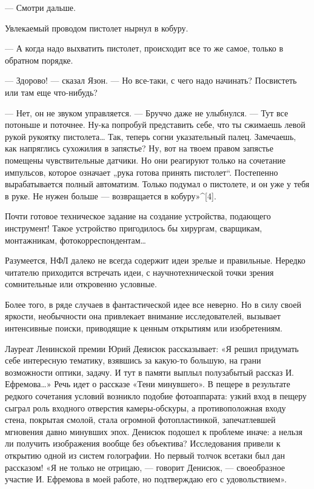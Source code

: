 — Смотри дальше.

Увлекаемый проводом пистолет нырнул в кобуру.

— А когда надо  выхватить пистолет, происходит все  то же самое, только  в
обратном порядке.

— Здорово! — сказал Язон. — Но все-таки, с чего надо начинать?  Посвистеть
или там еще что-нибудь?

— Нет, он не  звуком управляется. —  Бруччо даже не  улыбнулся. — Тут  все
потоньше и  поточнее. Ну-ка  попробуй представить  себе, что  ты  сжимаешь
левой рукой  рукоятку пистолета…  Так,  теперь согни  указательный  палец.
Замечаешь, как напряглись сухожилия  в запястье? Ну,  вот на твоем  правом
запястье помещены  чувствительные  датчики.  Но они  реагируют  только  на
сочетание импульсов,  которое  означает „рука  готова  принять  пистолет“.
Постепенно вырабатывается полный автоматизм. Только подумал о пистолете, и
он уже у тебя в руке. Не нужен больше — возвращается в кобуру»^[4].

Почти  готовое  техническое  задание  на  создание  устройства,  подающего
инструмент!  Такое   устройство   пригодилось  бы   хирургам,   сварщикам,
монтажникам, фотокорреспондентам…

Разумеется, НФЛ  далеко  не  всегда содержит  идеи  зрелые  и  правильные.
Нередко читателю  приходится  встречать идеи,  с  научнотехнической  точки
зрения сомнительные или откровенно условные.

Более того, в ряде  случаев в фантастической идее  все неверно. Но в  силу
своей  яркости,  необычности   она  привлекает  внимание   исследователей,
вызывает  интенсивные   поиски,   приводящие  к   ценным   открытиям   или
изобретениям.

Лауреат Ленинской  премии Юрий  Деяисюк рассказывает:  «Я решил  придумать
себе  интересную  тематику,  взявшись   за  какую-то  большую,  на   грани
возможности оптики, задачу. И тут  в памяти выплыл полузабытый рассказ  И.
Ефремова…» Речь идет о  рассказе «Тени минувшего».  В пещере в  результате
редкого сочетания  условий возникло  подобие  фотоаппарата: узкий  вход  в
пещеру сыграл роль  входного отверстия  камеры-обскуры, а  противоположная
входу стена, покрытая смолой, стала огромной фотопластинкой, запечатлевшей
мгновения давно минувших эпох. Денисюк подошел к проблеме иначе: а  нельзя
ли получить  изображения  вообще  без объектива?  Исследования  привели  к
открытию одной  из систем  голографии. Но  первый толчок  всетаки был  дан
рассказом! «Я  не только  не отрицаю,  — говорит  Денисюк, —  своеобразное
участие И. Ефремова в моей работе, но подтверждаю его с удовольствием».

